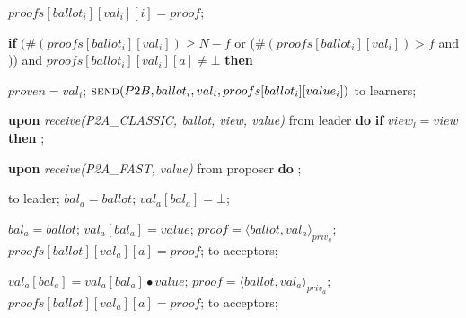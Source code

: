 \begin{algorithm}
\begin{algorithmic}[1]
		\State \hspace{\algorithmicindent} $proofs[ballot_i][val_i][i] = proof$;
		\State \hspace{\algorithmicindent} \parbox{\linewidth}{\textbf{if} $(\#(proofs[ballot_i][val_i]) \geq N-f$ or ($\#(proofs[ballot_i][val_i]) > f$ and )) and $proofs[ballot_i][val_i][a] \neq \bot$ \textbf{then}}
		\State \hspace{\algorithmicindent}\hspace{\algorithmicindent} $proven = val_i$;
		\State \hspace{\algorithmicindent}\hspace{\algorithmicindent} $\Call{send}{P2B, ballot_i, val_i, proofs[ballot_i][value_i]}$ to learners;
		
		\State
		\State \textbf{upon} \textit{receive(P2A\_CLASSIC, ballot, view, value)} from leader \textbf{do}
		\State \hspace{\algorithmicindent} \textbf{if} $view_l = view$ \textbf{then}
		\State \hspace{\algorithmicindent}\hspace{\algorithmicindent} ; 
		
		\State		
		\State \textbf{upon} \textit{receive(P2A\_FAST, value)} from proposer \textbf{do}
		\State \hspace{\algorithmicindent} ;
		
		\State
		\State {} to leader;
		\State $bal_a = ballot$;	
		\State $val_a[bal_a] = \bot$;	
		\EndIf
		\EndFunction
		
		\State
		\State $bal_a = ballot$;
		\State $val_a[bal_a] = value$;
		\State $proof = \langle ballot, val_a \rangle_{priv_a}$;
		\State $proofs[ballot][val_a][a] = proof$;
		\State {} to acceptors;
		\EndIf
		\EndFunction
		
		\State
		\State $val_a[bal_a] = val_a[bal_a] \bullet value$;
		\State $proof = \langle ballot, val_a \rangle_{priv_a}$;
		\State $proofs[ballot][val_a][a] = proof$;
		\State {} to acceptors;
		\EndIf
		\EndFunction
	\end{algorithmic}
\end{algorithm}

